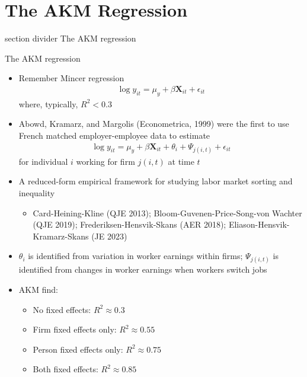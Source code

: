 \documentclass[9pt]{beamer}
\newcommand{\sectiondivider}[1]{
	\begin{frame}[plain]
		\vfill
		\begin{beamercolorbox}[wd=.84\textwidth,sep=1.1em,center,rounded=true]{section divider}
			{\usebeamerfont{section title} #1}
		\end{beamercolorbox}
		\vfill
	\end{frame}
}
\newcommand{\bit}{\begin{itemize}}
\newcommand{\eit}{\end{itemize}}
\begin{document}
\section{The AKM Regression}
\sectiondivider{The AKM regression}



\begin{frame}{The AKM regression}

\bit
\setlength\itemsep{1em}

\item Remember Mincer regression
\begin{eqnarray}
\log y_{it} = \mu_y + \beta \mathbf{X}_{it} + \epsilon_{it} \nonumber
\end{eqnarray}
where, typically, $R^2<0.3$

\item Abowd, Kramarz, and Margolis (Econometrica, 1999) were the first to use French matched employer-employee data to estimate
\begin{eqnarray}
\log y_{it} = \mu_y + \beta \mathbf{X}_{it} + \theta_i + \Psi_{j(i,t)} +  \epsilon_{it} \nonumber
\end{eqnarray}
for individual $i$ working for firm $j(i,t)$ at time $t$

\item A reduced-form empirical framework for studying labor market sorting and inequality
\bit
 	\item Card-Heining-Kline (QJE 2013); Bloom-Guvenen-Price-Song-von Wachter (QJE 2019); Frederiksen-Hensvik-Skans (AER 2018); Eliason-Hensvik-Kramarz-Skans (JE 2023)
\eit

\item $\theta_i$ is identified from variation in worker earnings within firms; $\Psi_{j(i,t)}$ is identified from changes in worker earnings when workers switch jobs

\item AKM find:
\bit
	\item No fixed effects: $R^2 \approx 0.3$
	\item Firm fixed effects only: $R^2 \approx 0.55$
	\item Person fixed effects only: $R^2 \approx 0.75$
	\item Both fixed effects: $R^2 \approx 0.85$
\eit

\eit

\end{frame}
\end{document}
